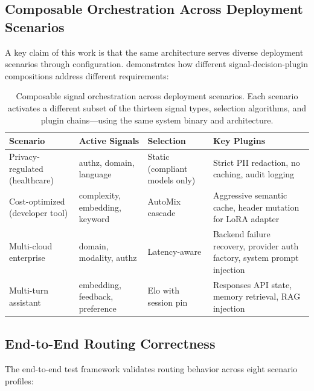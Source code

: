 \subsection{Composable Orchestration Across Deployment Scenarios}

A key claim of this work is that the same architecture serves diverse deployment scenarios through configuration.
 demonstrates how different signal-decision-plugin compositions address different requirements:

\begin{table}[htbp]
\centering
\caption{Composable signal orchestration across deployment scenarios. Each scenario activates a different subset of the thirteen signal types, selection algorithms, and plugin chains---using the same system binary and architecture.}
\label{tab:deployment_scenarios}
\begin{tabularx}{\linewidth}{
  >{\raggedright\arraybackslash}p{2.0cm}
  >{\raggedright\arraybackslash}X
  >{\raggedright\arraybackslash}p{1.9cm}
  >{\raggedright\arraybackslash}X
}
\toprule
\textbf{Scenario} & \textbf{Active Signals} & \textbf{Selection} & \textbf{Key Plugins} \\
\midrule
Privacy-regulated (healthcare) & authz, domain, language & Static (compliant models only) & Strict PII redaction, no caching, audit logging \\
Cost-optimized (developer tool) & complexity, embedding, keyword & AutoMix cascade & Aggressive semantic cache, header mutation for LoRA adapter \\
Multi-cloud enterprise & domain, modality, authz & Latency-aware & Backend failure recovery, provider auth factory, system prompt injection \\
Multi-turn assistant & embedding, feedback, preference & Elo with session pin & Responses API state, memory retrieval, RAG injection \\
\bottomrule
\end{tabularx}
\end{table}

\subsection{End-to-End Routing Correctness}

The end-to-end test framework validates routing behavior across eight scenario profiles:


